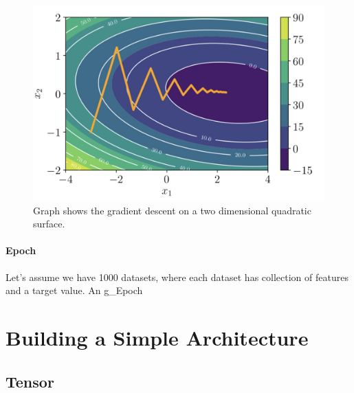 \begin{figure}[H]
	\centering
	\includegraphics[scale = 0.2]{attachment/chapter_10/Scc053}
	\caption{Graph shows the gradient descent on a two dimensional quadratic surface.}
\end{figure}

\paragraph{Epoch}

Let's assume we have 1000 datasets, where each dataset has collection of features and a target value. An \gls{g_Epoch}


\section{Building a Simple Architecture}
\subsection{Tensor}

